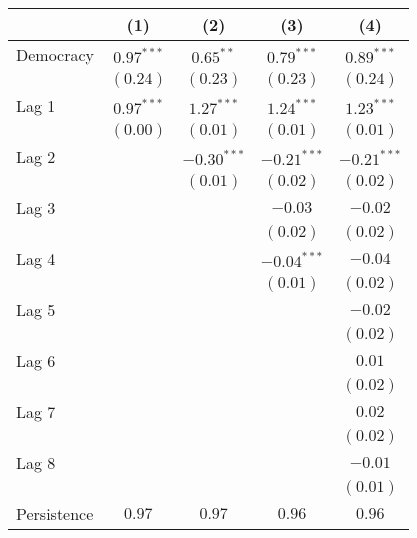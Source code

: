 
\begin{table}
\begin{center}
\begin{tabular}{l c c c c}
\hline
 & (1) & (2) & (3) & (4) \\
\hline
Democracy             & $0.97^{***}$ & $0.65^{**}$   & $0.79^{***}$  & $0.89^{***}$  \\
                      & $(0.24)$     & $(0.23)$      & $(0.23)$      & $(0.24)$      \\
Lag 1                 & $0.97^{***}$ & $1.27^{***}$  & $1.24^{***}$  & $1.23^{***}$  \\
                      & $(0.00)$     & $(0.01)$      & $(0.01)$      & $(0.01)$      \\
Lag 2                 &              & $-0.30^{***}$ & $-0.21^{***}$ & $-0.21^{***}$ \\
                      &              & $(0.01)$      & $(0.02)$      & $(0.02)$      \\
Lag 3                 &              &               & $-0.03$       & $-0.02$       \\
                      &              &               & $(0.02)$      & $(0.02)$      \\
Lag 4                 &              &               & $-0.04^{***}$ & $-0.04$       \\
                      &              &               & $(0.01)$      & $(0.02)$      \\
Lag 5                 &              &               &               & $-0.02$       \\
                      &              &               &               & $(0.02)$      \\
Lag 6                 &              &               &               & $0.01$        \\
                      &              &               &               & $(0.02)$      \\
Lag 7                 &              &               &               & $0.02$        \\
                      &              &               &               & $(0.02)$      \\
Lag 8                 &              &               &               & $-0.01$       \\
                      &              &               &               & $(0.01)$      \\
\hline
Persistence           & $0.97$       & $0.97$        & $0.96$        & $0.96$        \\

\end{tabular}
\end{center}
\end{table}

